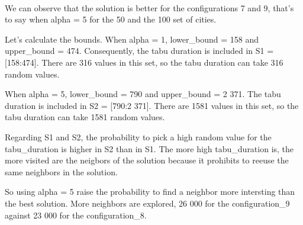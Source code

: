 \documentclass[12pt,oneside,a4paper]{article}
\begin{document}
\paragraph{}

We can observe that the solution is better for the configurations 7 and 9, that's to say when
alpha = 5 for the 50 and the 100 set of cities.

Let's calculate the bounds.
When alpha = 1, lower\_bound = 158 and upper\_bound = 474.
Consequently, the tabu duration is included in S1 = [158:474]. 
There are 316 values in this set, so the tabu duration can take 316 random values.

When alpha = 5, lower\_bound = 790 and upper\_bound = 2 371.
The tabu duration is included in S2 = [790:2 371].
There are 1581 values in this set, so the tabu duration can take 1581 random values.

Regarding S1 and S2, the probability to pick a high random value for the tabu\_duration is higher in S2 than in S1.
The more high tabu\_duration is, the more visited are the neigbors of the solution because it prohibits to reeuse the
same neighbors in the solution.

So using alpha = 5 raise the probability to find a neighbor more intersting than the best solution. More neighbors
are explored, 26 000 for the configuration\_9 against 23 000 for the configuration\_8. 
\end{document}

